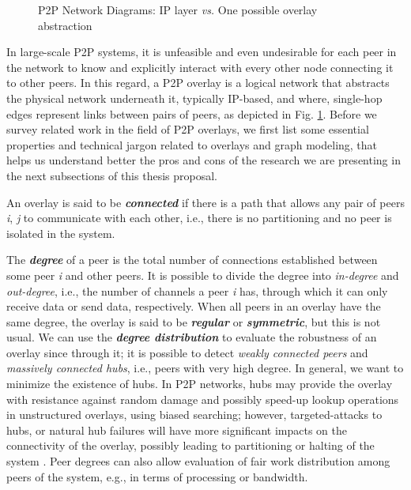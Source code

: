 \documentclass[runningheads]{llncs}
\begin{document}
\begin{figure}[t]
    \centering
    \hspace{0.2\textwidth}
    \caption{P2P Network Diagrams: IP layer \textit{vs.} One possible overlay abstraction}
    \label{fig:network_diagrams}
\end{figure}

In large-scale P2P systems, it is unfeasible and even undesirable for each peer in the network to know and explicitly interact with every other node connecting it to other peers. In this regard, a P2P overlay is a logical network that abstracts the physical network underneath it, typically IP-based, and where, single-hop edges represent links between pairs of peers, as depicted in Fig. \ref{fig:network_diagrams}. Before we survey related work in the field of P2P overlays, we first list some essential properties and technical jargon related to overlays and graph modeling, that helps us understand better the pros and cons of the research we are presenting in the next subsections of this thesis proposal.

An overlay is said to be \textbf{\textit{connected}} if there is a path that allows any pair of peers \textit{i}, \textit{j} to communicate with each other, i.e., there is no partitioning and no peer is isolated in the system.

The \textbf{\textit{degree}} of a peer is the total number of connections established between some peer \textit{i} and other peers. It is possible to divide the degree into \textit{in-degree} and \textit{out-degree}, i.e., the number of channels a peer \textit{i} has, through which it can only receive data or send data, respectively. When all peers in an overlay have the same degree, the overlay is said to be \textbf{\textit{regular}} or \textbf{\textit{symmetric}}, but this is not usual. We can use the \textbf{\textit{degree distribution}} to evaluate the robustness of an overlay since through it; it is possible to detect \textit{weakly connected peers} and \textit{massively connected hubs}, i.e., peers with very high degree. In general, we want to minimize the existence of hubs. In P2P networks, hubs may provide the overlay with resistance against random damage and possibly speed-up lookup operations in unstructured overlays, using biased searching; however, targeted-attacks to hubs, or natural hub failures will have more significant impacts on the connectivity of the overlay, possibly leading to partitioning or halting of the system \cite{webdragons, controlling_the_hubs}. Peer degrees can also allow evaluation of fair work distribution among peers of the system, e.g., in terms of processing or bandwidth.
\end{document}
